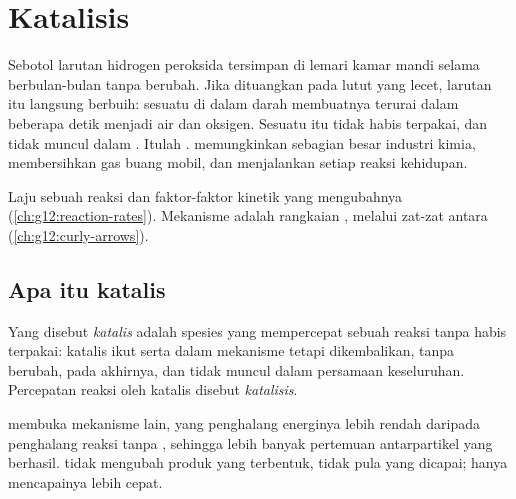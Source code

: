 \chapter{Katalisis}\label{ch:g12:catalysis}

Sebotol larutan hidrogen peroksida tersimpan di lemari kamar mandi
selama berbulan-bulan tanpa berubah. Jika dituangkan pada lutut yang
lecet, larutan itu langsung berbuih: sesuatu di dalam darah membuatnya
terurai dalam beberapa detik menjadi air dan oksigen. Sesuatu itu tidak
habis terpakai, dan tidak muncul dalam . Itulah
.  memungkinkan sebagian besar industri kimia,
membersihkan gas buang mobil, dan menjalankan setiap reaksi kehidupan.

\begin{recall}
Laju sebuah reaksi dan faktor-faktor kinetik yang mengubahnya
(\cref{ch:g12:reaction-rates}). Mekanisme adalah rangkaian , melalui zat-zat antara (\cref{ch:g12:curly-arrows}).
\end{recall}

\section{Apa itu katalis}

\begin{definition}\label{def:g12:catalysis:catalyst}
Yang disebut \emph{katalis} adalah spesies yang
mempercepat sebuah reaksi tanpa habis terpakai: katalis ikut serta
dalam mekanisme tetapi dikembalikan, tanpa berubah, pada akhirnya, dan
tidak muncul dalam persamaan keseluruhan. Percepatan reaksi oleh katalis
disebut \emph{katalisis}.
\end{definition}

\begin{proposition}\label{prop:g12:catalysis:path}
 membuka mekanisme lain, yang penghalang energinya lebih rendah
daripada penghalang reaksi tanpa , sehingga lebih banyak
pertemuan antarpartikel yang berhasil.  tidak mengubah produk
yang terbentuk, tidak pula  yang dicapai;  hanya
mencapainya lebih cepat.
\end{proposition}

